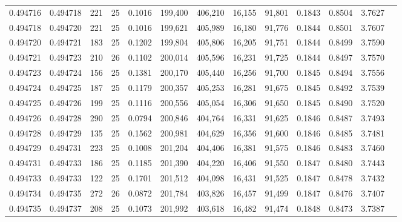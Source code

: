 \begin{tabular}{rrrrrrrrrrrrr}
0.494716 & 0.494718 & 221 &  25 &                                     0.1016 & 199,400 & 406,210 &  16,155 &  91,801 & 0.1843 & 0.8504 & 3.7627 \\
0.494718 & 0.494720 & 221 &  25 &                                     0.1016 & 199,621 & 405,989 &  16,180 &  91,776 & 0.1844 & 0.8501 & 3.7607 \\
0.494720 & 0.494721 & 183 &  25 &                                     0.1202 & 199,804 & 405,806 &  16,205 &  91,751 & 0.1844 & 0.8499 & 3.7590 \\
0.494721 & 0.494723 & 210 &  26 &                                     0.1102 & 200,014 & 405,596 &  16,231 &  91,725 & 0.1844 & 0.8497 & 3.7570 \\
0.494723 & 0.494724 & 156 &  25 &                                     0.1381 & 200,170 & 405,440 &  16,256 &  91,700 & 0.1845 & 0.8494 & 3.7556 \\
0.494724 & 0.494725 & 187 &  25 &                                     0.1179 & 200,357 & 405,253 &  16,281 &  91,675 & 0.1845 & 0.8492 & 3.7539 \\
0.494725 & 0.494726 & 199 &  25 &                                     0.1116 & 200,556 & 405,054 &  16,306 &  91,650 & 0.1845 & 0.8490 & 3.7520 \\
0.494726 & 0.494728 & 290 &  25 &                                     0.0794 & 200,846 & 404,764 &  16,331 &  91,625 & 0.1846 & 0.8487 & 3.7493 \\
0.494728 & 0.494729 & 135 &  25 &                                     0.1562 & 200,981 & 404,629 &  16,356 &  91,600 & 0.1846 & 0.8485 & 3.7481 \\
0.494729 & 0.494731 & 223 &  25 &                                     0.1008 & 201,204 & 404,406 &  16,381 &  91,575 & 0.1846 & 0.8483 & 3.7460 \\
0.494731 & 0.494733 & 186 &  25 &                                     0.1185 & 201,390 & 404,220 &  16,406 &  91,550 & 0.1847 & 0.8480 & 3.7443 \\
0.494733 & 0.494733 & 122 &  25 &                                     0.1701 & 201,512 & 404,098 &  16,431 &  91,525 & 0.1847 & 0.8478 & 3.7432 \\
0.494734 & 0.494735 & 272 &  26 &                                     0.0872 & 201,784 & 403,826 &  16,457 &  91,499 & 0.1847 & 0.8476 & 3.7407 \\
0.494735 & 0.494737 & 208 &  25 &                                     0.1073 & 201,992 & 403,618 &  16,482 &  91,474 & 0.1848 & 0.8473 & 3.7387 \\

\end{tabular}
